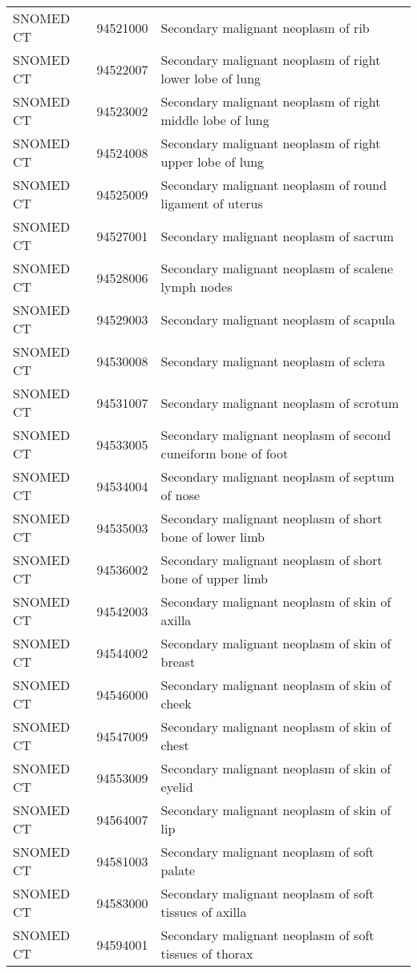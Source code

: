 \begin{longtable}{p{}p{}p{}}
  SNOMED CT & 94521000 & Secondary malignant neoplasm of rib \\ 
  SNOMED CT & 94522007 & Secondary malignant neoplasm of right lower lobe of lung \\ 
  SNOMED CT & 94523002 & Secondary malignant neoplasm of right middle lobe of lung \\ 
  SNOMED CT & 94524008 & Secondary malignant neoplasm of right upper lobe of lung \\ 
  SNOMED CT & 94525009 & Secondary malignant neoplasm of round ligament of uterus \\ 
  SNOMED CT & 94527001 & Secondary malignant neoplasm of sacrum \\ 
  SNOMED CT & 94528006 & Secondary malignant neoplasm of scalene lymph nodes \\ 
  SNOMED CT & 94529003 & Secondary malignant neoplasm of scapula \\ 
  SNOMED CT & 94530008 & Secondary malignant neoplasm of sclera \\ 
  SNOMED CT & 94531007 & Secondary malignant neoplasm of scrotum \\ 
  SNOMED CT & 94533005 & Secondary malignant neoplasm of second cuneiform bone of foot \\ 
  SNOMED CT & 94534004 & Secondary malignant neoplasm of septum of nose \\ 
  SNOMED CT & 94535003 & Secondary malignant neoplasm of short bone of lower limb \\ 
  SNOMED CT & 94536002 & Secondary malignant neoplasm of short bone of upper limb \\ 
  SNOMED CT & 94542003 & Secondary malignant neoplasm of skin of axilla \\ 
  SNOMED CT & 94544002 & Secondary malignant neoplasm of skin of breast \\ 
  SNOMED CT & 94546000 & Secondary malignant neoplasm of skin of cheek \\ 
  SNOMED CT & 94547009 & Secondary malignant neoplasm of skin of chest \\ 
  SNOMED CT & 94553009 & Secondary malignant neoplasm of skin of eyelid \\ 
  SNOMED CT & 94564007 & Secondary malignant neoplasm of skin of lip \\ 
  SNOMED CT & 94581003 & Secondary malignant neoplasm of soft palate \\ 
  SNOMED CT & 94583000 & Secondary malignant neoplasm of soft tissues of axilla \\ 
  SNOMED CT & 94594001 & Secondary malignant neoplasm of soft tissues of thorax \\ 

\end{longtable}
